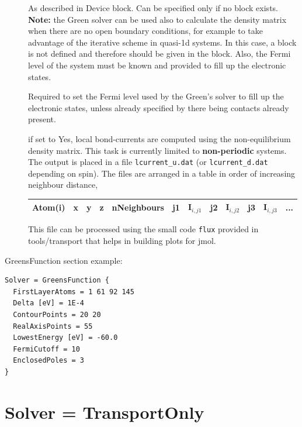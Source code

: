 \begin{description}
\item[] As described in Device block. Can be specified only
  if no  block exists.  {\bf Note:} the Green solver can be used
  also to calculate the density matrix when there are no open boundary
  conditions, for example to take advantage of the iterative scheme in quasi-1d
  systems. In this case, a  block is not defined and therefore
   should be given in the  block. Also,
  the Fermi level of the system must be known and provided to fill up the
  electronic states.

\item[] Required to set the Fermi level
  used by the Green's solver to fill up the electronic states, unless already
  specified by there being contacts already present.

\item[] if set to Yes, local bond-currents are computed using
  the non-equilibrium density matrix.  This task is currently limited to
  \textbf{non-periodic} systems. The output is placed in a file
  \verb|lcurrent_u.dat| (or \verb|lcurrent_d.dat| depending on spin).  The files
  are arranged in a table in order of increasing neighbour distance,

\begin{tabular}{|c|c|c|c|c|c|c|c|c|c|c|c|}
  \hline
  Atom(i) & x & y & z &  nNeighbours &  j1 & I$_{i,j1}$ & j2 & I$_{i,j2}$ &  j3 & I$_{i,j3}$ & ...\\
  \hline
\end{tabular}

  This file can be processed using the small code \verb|flux| provided in
  tools/transport that helps in building plots for jmol.
\end{description}

GreensFunction section example:

\begin{verbatim}
Solver = GreensFunction {
  FirstLayerAtoms = 1 61 92 145
  Delta [eV] = 1E-4
  ContourPoints = 20 20
  RealAxisPoints = 55
  LowestEnergy [eV] = -60.0
  FermiCutoff = 10
  EnclosedPoles = 3
}
\end{verbatim}


\section{Solver = TransportOnly}

